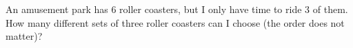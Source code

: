 An amusement park has $6$ roller coasters, but I only have time to ride $3$ of them. How many different sets of three roller coasters can I choose (the order does not matter)?
